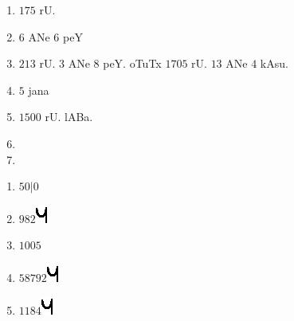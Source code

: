 
\begin{multicols}{2}
\begin{enumerate}[$(1)$]
\item $175$ rU.
\item $6$ ANe $6$ peY
\item $213$ rU. $3$ ANe $8$ peY. oTuTx $1705$ rU. $13$ ANe $4$ kAsu.
\item $5$ jana
\item $1500$ rU. lABa.
\item[]
\item[]
\end{enumerate}
\end{multicols}


\begin{multicols}{3}
\begin{enumerate}[$(1)$]
\item $50|$0 
\item $982$\includegraphics{images/u.eps}
\item $1005$ 
\item $58792$\includegraphics{images/u.eps}  
\item $1184$\includegraphics{images/u.eps}
\end{enumerate}
\end{multicols}



